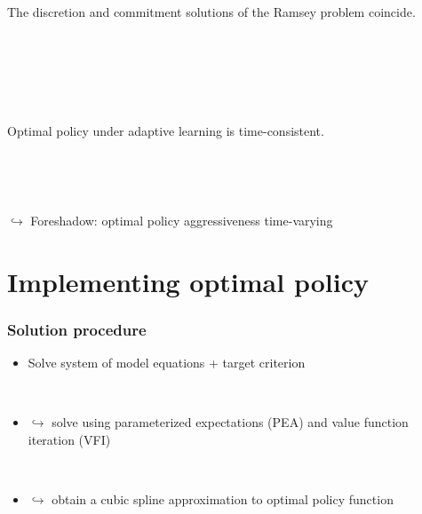 \documentclass[10pt]{beamer}
\begin{document}
\begin{frame}
	\frametitle{}
	\label{no_commitment}

\begin{lemma} The discretion and commitment solutions of the Ramsey problem coincide. 
\end{lemma}

\

\hfill \hyperlink{no_commitment_intuition}{}

\

\

\begin{corollary} Optimal policy under adaptive learning is time-consistent. 
\end{corollary}


\

\

$\hookrightarrow $ Foreshadow: optimal policy aggressiveness time-varying

\vfill




\end{frame}

\section{Implementing optimal policy}


\begin{frame}
	\frametitle{Solution procedure}
	
\begin{itemize}
\item[] Solve system of model equations + target criterion 

\

\item[] $\hookrightarrow$ solve using parameterized expectations (PEA) and value function iteration (VFI)

\


\item[] $\hookrightarrow$ obtain a cubic spline approximation to optimal policy function

\

\end{itemize}


\end{frame}
\end{document}
